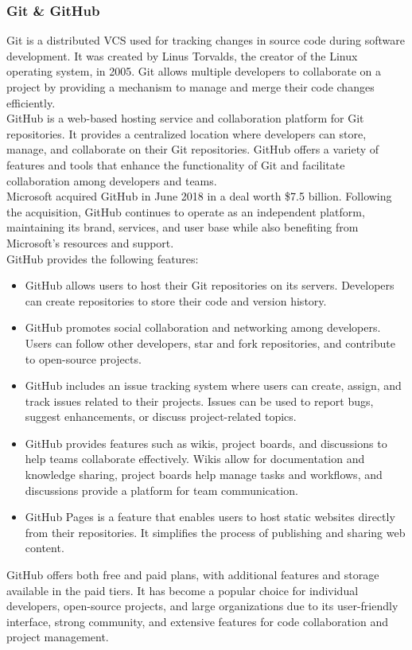 \subsubsection{Git \& GitHub}
Git is a distributed \ac{VCS} used for tracking changes in source code during software development. It was created by Linus Torvalds, the creator of the Linux operating system, in 2005. Git allows multiple developers to collaborate on a project by providing a mechanism to manage and merge their code changes efficiently.\vspace{5mm} \\
GitHub is a web-based hosting service and collaboration platform for Git repositories. It provides a centralized location where developers can store, manage, and collaborate on their Git repositories. GitHub offers a variety of features and tools that enhance the functionality of Git and facilitate collaboration among developers and teams.\vspace{5mm} \\
Microsoft acquired GitHub in June 2018 in a deal worth \$7.5 billion. Following the acquisition, GitHub continues to operate as an independent platform, maintaining its brand, services, and user base while also benefiting from Microsoft's resources and support.\vspace{5mm} \\
GitHub provides the following features:
\begin{itemize}
  \item GitHub allows users to host their Git repositories on its servers. Developers can create repositories to store their code and version history.
  \item GitHub promotes social collaboration and networking among developers. Users can follow other developers, star and fork repositories, and contribute to open-source projects.
  \item GitHub includes an issue tracking system where users can create, assign, and track issues related to their projects. Issues can be used to report bugs, suggest enhancements, or discuss project-related topics.
  \item GitHub provides features such as wikis, project boards, and discussions to help teams collaborate effectively. Wikis allow for documentation and knowledge sharing, project boards help manage tasks and workflows, and discussions provide a platform for team communication.
  \item GitHub Pages is a feature that enables users to host static websites directly from their repositories. It simplifies the process of publishing and sharing web content.
\end{itemize}
GitHub offers both free and paid plans, with additional features and storage available in the paid tiers. It has become a popular choice for individual developers, open-source projects, and large organizations due to its user-friendly interface, strong community, and extensive features for code collaboration and project management.
